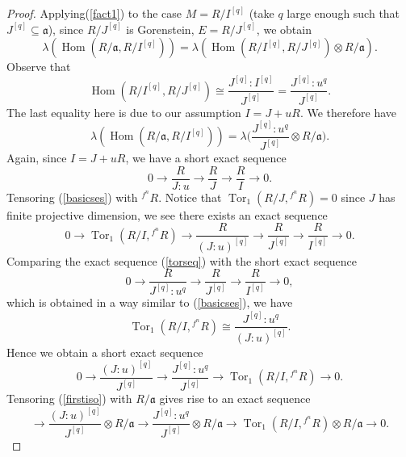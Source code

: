 \documentclass[draft]{amsart}
\theoremstyle{definition}
\numberwithin{equation}{theorem}
\begin{document}
\begin{proof}
Applying(\ref{fact1}) to the case $M=R/I^{[q]}$ (take $q$ large enough such that $ J^{[q] }\subseteq {\mathfrak{a}}$),
since $R/J^{[q]}$ is Gorenstein, $E=R/J^{[q]}$, we obtain
\begin{equation*}
{\lambda}({\mathop{\mathrm{Hom}}\nolimits}(R/{\mathfrak{a}},R/I^{[q]}))={\lambda}({\mathop{\mathrm{Hom}}\nolimits} (R/I^{[q]}, R/J^{[q]}) \otimes R/{\mathfrak{a}}).
\end{equation*}
Observe that
\begin{equation*}
{\mathop{\mathrm{Hom}}\nolimits} (R/I^{[q]}, R/J^{[q]}) \cong \dfrac{J^{[q]}:I^{[q]}}{J^{[q]}}=\dfrac{J^{[q]}:u^q}{J^{[q]}}.
\end{equation*}
The last equality here is due to our assumption $I=J+uR$. We therefore have
\begin{equation}\label{twolength}
{\lambda}({\mathop{\mathrm{Hom}}\nolimits}(R/{\mathfrak{a}},R/I^{[q]}))={\lambda} \bigg(\dfrac{J^{[q]}:u^q}{J^{[q]}}  \otimes R/{\mathfrak{a}} \bigg).
\end{equation}
Again, since $I=J+uR$, we have a short exact sequence
\begin{equation}\label{basicses}
0 \to \dfrac{R}{J:u} \to \dfrac{R}{J} \to \dfrac{R}{I} \to 0.
\end{equation}
Tensoring (\ref{basicses}) with $ {}^{f^n}\!\! R$. Notice that ${\mathop{\mathrm{Tor}}\nolimits}_1(R/J,  {}^{f^n}\!\! R)=0$ since $J$ has finite projective dimension,
we see there exists an exact sequence
\begin{equation}\label{torseq}
0 \to {\mathop{\mathrm{Tor}}\nolimits}_1(R/I, {}^{f^n}\!\! R) \to \dfrac{R}{(J:u)^{[q]}} \to \dfrac{R}{J^{[q]}} \to \dfrac{R}{I^{[q]}}\to 0.
\end{equation}
Comparing the exact sequence (\ref{torseq}) with the short exact sequence
\[0 \to \dfrac{R}{J^{[q]}:u^q} \to \dfrac{R}{J^{[q]}} \to \dfrac{R}{I^{[q]}} \to 0,\]
which is obtained in a way similar to (\ref{basicses}),
we have
\[{\mathop{\mathrm{Tor}}\nolimits}_1(R/I, {}^{f^n}\!\! R) \cong \dfrac{J^{[q]}:u^q}{(J:u)^{[q]}}. \]
Hence we obtain a short exact sequence
\begin{equation}\label{firstiso}
0 \to \dfrac{(J:u)^{[q]}}{J^{[q]}} \to \dfrac{J^{[q]}:u^q}{J^{[q]}} \to{\mathop{\mathrm{Tor}}\nolimits}_1(R/I, {}^{f^n}\!\! R)  \to 0.
\end{equation}
Tensoring (\ref{firstiso}) with $R/ {\mathfrak{a}}$ gives rise to an exact sequence
\[\to \dfrac{(J:u)^{[q]}}{J^{[q]}} \otimes R/ {\mathfrak{a}} \to \dfrac{J^{[q]}:u^q}{J^{[q]}} \otimes R/ {\mathfrak{a}} \to {\mathop{\mathrm{Tor}}\nolimits}_1(R/I, {}^{f^n}\!\! R)\otimes R/ {\mathfrak{a}}  \to 0.\]

\end{proof}
\end{document}
